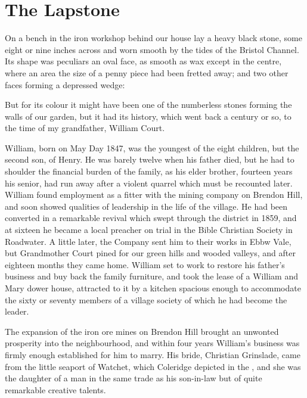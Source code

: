 \section{The Lapstone}

On a bench in the iron workshop behind our house lay a heavy black stone, some eight or nine inches across and worn smooth by the tides of the Bristol Channel. Its shape was peculiars an oval face, as smooth as wax except in the centre, where an area the size of a penny piece had been fretted away; and two other faces forming a depressed wedge:

But for its colour it might have been one of the numberless stones forming the walls of our garden, but it had its history, which went back a century or so, to the time of my grandfather, William Court.

William, born on May Day 1847, was the youngest of the eight children, but the second son, of Henry. He was barely twelve when his father died, but he had to shoulder the financial burden of the family, as his elder brother, fourteen years his senior, had run away after a violent quarrel which must be recounted later. William found employment as a fitter with the mining company on Brendon Hill, and soon showed qualities of leadership in the life of the village. He had been converted in a remarkable revival which swept through the district in 1859, and at sixteen he became a local preacher on trial in the Bible Christian Society in Roadwater. A little later, the Company sent him to their works in Ebbw Vale, but Grandmother Court pined for our green hills and wooded valleys, and after eighteen months they came home. William set to work to restore his father's business and buy back the family furniture, and took the lease of a William and Mary dower house, attracted to it by a kitchen spacious enough to accommodate the sixty or seventy members of a village society of which he had become the leader.

The expansion of the iron ore mines on Brendon Hill brought an unwonted prosperity into the neighbourhood, and within four years William's business was firmly enough established for him to marry. His bride, Christian Grinslade, came from the little seaport of Watchet, which Coleridge depicted in the , and she was the daughter of a man in the same trade as his son-in-law but of quite remarkable creative talents.

